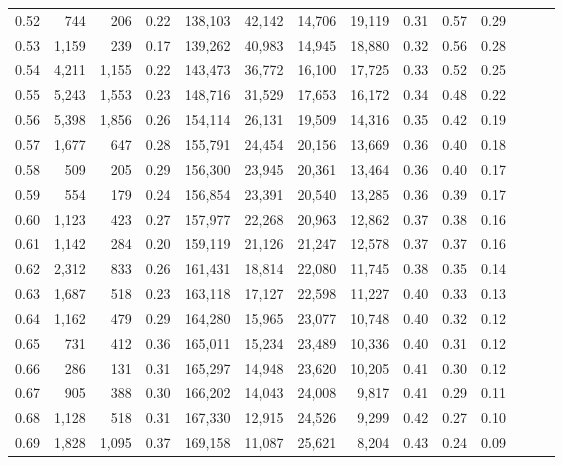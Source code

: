 \begin{tabular}{rrrrrrrrrrrrrr}
0.52 &     744 &    206 &  0.22 &  138,103 &   42,142 &  14,706 &  19,119 &  0.31 &  0.57 &      0.29 \\
0.53 &   1,159 &    239 &  0.17 &  139,262 &   40,983 &  14,945 &  18,880 &  0.32 &  0.56 &      0.28 \\
0.54 &   4,211 &  1,155 &  0.22 &  143,473 &   36,772 &  16,100 &  17,725 &  0.33 &  0.52 &      0.25 \\
0.55 &   5,243 &  1,553 &  0.23 &  148,716 &   31,529 &  17,653 &  16,172 &  0.34 &  0.48 &      0.22 \\
0.56 &   5,398 &  1,856 &  0.26 &  154,114 &   26,131 &  19,509 &  14,316 &  0.35 &  0.42 &      0.19 \\
0.57 &   1,677 &    647 &  0.28 &  155,791 &   24,454 &  20,156 &  13,669 &  0.36 &  0.40 &      0.18 \\
0.58 &     509 &    205 &  0.29 &  156,300 &   23,945 &  20,361 &  13,464 &  0.36 &  0.40 &      0.17 \\
0.59 &     554 &    179 &  0.24 &  156,854 &   23,391 &  20,540 &  13,285 &  0.36 &  0.39 &      0.17 \\
0.60 &   1,123 &    423 &  0.27 &  157,977 &   22,268 &  20,963 &  12,862 &  0.37 &  0.38 &      0.16 \\
0.61 &   1,142 &    284 &  0.20 &  159,119 &   21,126 &  21,247 &  12,578 &  0.37 &  0.37 &      0.16 \\
0.62 &   2,312 &    833 &  0.26 &  161,431 &   18,814 &  22,080 &  11,745 &  0.38 &  0.35 &      0.14 \\
0.63 &   1,687 &    518 &  0.23 &  163,118 &   17,127 &  22,598 &  11,227 &  0.40 &  0.33 &      0.13 \\
0.64 &   1,162 &    479 &  0.29 &  164,280 &   15,965 &  23,077 &  10,748 &  0.40 &  0.32 &      0.12 \\
0.65 &     731 &    412 &  0.36 &  165,011 &   15,234 &  23,489 &  10,336 &  0.40 &  0.31 &      0.12 \\
0.66 &     286 &    131 &  0.31 &  165,297 &   14,948 &  23,620 &  10,205 &  0.41 &  0.30 &      0.12 \\
0.67 &     905 &    388 &  0.30 &  166,202 &   14,043 &  24,008 &   9,817 &  0.41 &  0.29 &      0.11 \\
0.68 &   1,128 &    518 &  0.31 &  167,330 &   12,915 &  24,526 &   9,299 &  0.42 &  0.27 &      0.10 \\
0.69 &   1,828 &  1,095 &  0.37 &  169,158 &   11,087 &  25,621 &   8,204 &  0.43 &  0.24 &      0.09 \\

\end{tabular}

